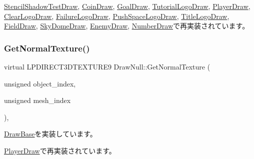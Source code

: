 \mbox{\hyperlink{class_stencil_shadow_test_draw_acfa569f1dcdc3829796138e313f204ad}{Stencil\+Shadow\+Test\+Draw}}, \mbox{\hyperlink{class_coin_draw_a178c8d88effe55aaad7d0e45b02e0566}{Coin\+Draw}}, \mbox{\hyperlink{class_goal_draw_a7f30c7a4325668eebd8730ad2bea1ad8}{Goal\+Draw}}, \mbox{\hyperlink{class_tutorial_logo_draw_a19de254c5460e3728d7c79243fd65e6f}{Tutorial\+Logo\+Draw}}, \mbox{\hyperlink{class_player_draw_ad9e2e09a32c7474fcea5e7e24e22bc71}{Player\+Draw}}, \mbox{\hyperlink{class_clear_logo_draw_a99aba47b4693f15498daf7df2bfee2d7}{Clear\+Logo\+Draw}}, \mbox{\hyperlink{class_failure_logo_draw_aa7164b6f5788416788482893aa747d59}{Failure\+Logo\+Draw}}, \mbox{\hyperlink{class_push_space_logo_draw_a9a40fca53e23b9970a7c5decaa3d2da6}{Push\+Space\+Logo\+Draw}}, \mbox{\hyperlink{class_title_logo_draw_a14212f1ee003c40d63db3822a84af7fb}{Title\+Logo\+Draw}}, \mbox{\hyperlink{class_field_draw_aeb54d8cba559ef615ee46c8a7bbd3b9f}{Field\+Draw}}, \mbox{\hyperlink{class_sky_dome_draw_a7ecd8d4b987e4d58a247d3438a45f9d4}{Sky\+Dome\+Draw}}, \mbox{\hyperlink{class_enemy_draw_acda1a2487aea432b08fc816351a12239}{Enemy\+Draw}}, \mbox{\hyperlink{class_number_draw_a8234fb06d885feaa8a2f0ecf256db9a0}{Number\+Draw}}で再実装されています。

\mbox{\label{class_draw_null_a41b7d148612b2d328e85289e32dc374c}} 
\subsubsection{\texorpdfstring{Get\+Normal\+Texture()}{GetNormalTexture()}}
{\footnotesize\ttfamily virtual L\+P\+D\+I\+R\+E\+C\+T3\+D\+T\+E\+X\+T\+U\+R\+E9 Draw\+Null\+::\+Get\+Normal\+Texture (\begin{DoxyParamCaption}\item[{unsigned}]{object\+\_\+index,  }\item[{unsigned}]{mesh\+\_\+index }\end{DoxyParamCaption})\hspace{0.3cm}{\ttfamily [inline]}, {\ttfamily [virtual]}}



\mbox{\hyperlink{class_draw_base_a87bb54e7f422959e84ac00aa7631bd3b}{Draw\+Base}}を実装しています。



\mbox{\hyperlink{class_player_draw_abb93b530e38fc224ecbfe17d623f10fb}{Player\+Draw}}で再実装されています。

